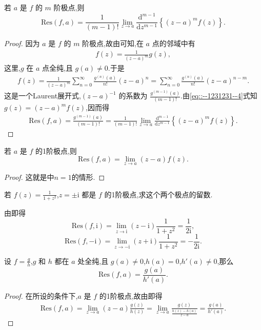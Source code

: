\documentclass[../../main.tex]{subfiles}
\begin{document}
\begin{proposition}\label{proposition:命题5.4.2}
若 \( a \) 是 \( f \) 的 \( m \) 阶极点,则
\[
\mathrm{Res}(f,a) = \frac{1}{(m - 1)!} \lim_{z \to a} \frac{\mathrm{d}^{m - 1}}{\mathrm{d}z^{m - 1}} \left\{ (z - a)^m f(z) \right\}.
\]
\end{proposition}
\begin{proof}
因为 \( a \) 是 \( f \) 的 \( m \) 阶极点,故由可知,在 \( a \) 点的邻域中有
\begin{align}
f(z) = \frac{1}{(z - a)^m} g(z), 
\label{eq::--1231231--4}
\end{align}
这里,\( g \) 在 \( a \) 点全纯,且 \( g(a) \neq 0 \).于是
\begin{align*}
f(z) = \frac{1}{(z - a)^m} \sum_{n = 0}^{\infty} \frac{g^{(n)}(a)}{n!} (z - a)^n = \sum_{n = 0}^{\infty} \frac{g^{(n)}(a)}{n!} (z - a)^{n - m}.
\end{align*}
这是一个Laurent展开式,\( (z - a)^{-1} \) 的系数为 \( \frac{g^{(m - 1)}(a)}{(m - 1)!} \).由\eqref{eq::--1231231--4}式知 \( g(z) = (z - a)^m f(z) \),因而得
\begin{align*}
\mathrm{Res}(f,a) = \frac{g^{(m - 1)}(a)}{(m - 1)!} = \frac{1}{(m - 1)!} \lim_{z \to a} \frac{\mathrm{d}^{m - 1}}{\mathrm{d}z^{m - 1}} \left\{ (z - a)^m f(z) \right\}.
\end{align*}
\end{proof}

\begin{proposition}\label{proposition:命题5.4.3}
若 \( a \) 是 \( f \) 的1阶极点,则
\[
\mathrm{Res}(f,a) = \lim_{z \to a} (z - a) f(z).
\]
\end{proposition}
\begin{proof}
这就是中$n=1$的情形.
\end{proof}

\begin{example}
若 \( f(z) = \frac{1}{1 + z^2} \),\( z = \pm \mathrm{i} \) 都是 \( f \) 的1阶极点,求这个两个极点的留数.
\end{example}
\begin{solution}
由即得
\[
\mathrm{Res}(f,\mathrm{i}) = \lim_{z \to \mathrm{i}} (z - \mathrm{i}) \frac{1}{1 + z^2} = \frac{1}{2\mathrm{i}},
\]
\[
\mathrm{Res}(f, -\mathrm{i}) = \lim_{z \to -\mathrm{i}} (z + \mathrm{i}) \frac{1}{1 + z^2} = -\frac{1}{2\mathrm{i}}.
\]
\end{solution}

\begin{proposition}\label{proposition:命题5.4.5}
设 \( f = \frac{g}{h} \),\( g \) 和 \( h \) 都在 \( a \) 处全纯,且 \( g(a) \neq 0 \),\( h(a) = 0 \),\( h'(a) \neq 0 \),那么
\[
\mathrm{Res}(f,a) = \frac{g(a)}{h'(a)}.
\]
\end{proposition}
\begin{proof}
在所设的条件下,\( a \) 是 \( f \) 的1阶极点,故由即得
\begin{align*}
\mathrm{Res}(f,a) = \lim_{z \to a} (z - a) \frac{g(z)}{h(z)} = \lim_{z \to a} \frac{g(z)}{\frac{h(z) - h(a)}{z - a}} = \frac{g(a)}{h'(a)}.
\end{align*}
\end{proof}
\end{document}
